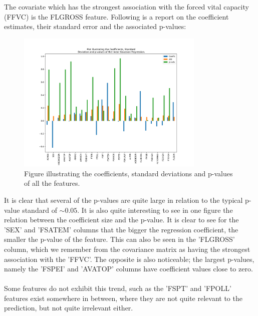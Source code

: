 \documentclass[]{article}
\begin{document}
The covariate which has the strongest association with the forced vital capacity (FFVC) is the FLGROSS feature. Following is a report on the coefficient estimates, their standard error and the associated p-values:
\begin{figure}[H]
	\centering
	\includegraphics[width=0.8\textwidth]{figures/coefs_std_pvals.pdf}
	\caption{Figure illustrating the coefficients, standard deviations and p-values of all the features.}
	\label{fig:coefs_std_pval}
\end{figure}
It is clear that several of the p-values are quite large in relation to the typical p-value standard of $\sim 0.05$. It is also quite interesting to see in one figure the relation between the coefficient size and the p-value. It is clear to see for the 'SEX' and 'FSATEM' columns that the bigger the regression coefficient, the smaller the p-value of the feature. This can also be seen in the 'FLGROSS' column, which we remember from the covariance matrix as having the strongest association with the 'FFVC'. The opposite is also noticeable; the largest p-values, namely the 'FSPEI' and 'AVATOP' columns have coefficient values close to zero.\\\\ 
Some features do not exhibit this trend, such as the 'FSPT' and 'FPOLL' features exist somewhere in between, where they are not quite relevant to the prediction, but not quite irrelevant either.
\end{document}
